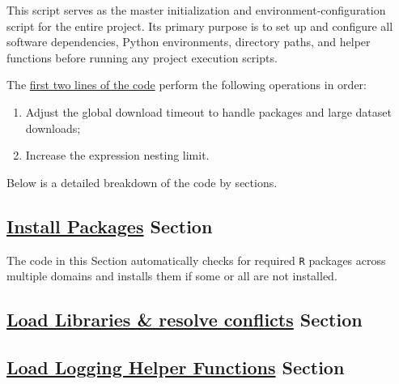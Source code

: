 \documentclass[
]{report}
\providecommand{\tightlist}{%
  \setlength{\itemsep}{0pt}\setlength{\parskip}{0pt}}
\begin{document}
\hfill\break

This script serves as the master initialization and environment-configuration script for the entire project.
Its primary purpose is to set up and configure all software dependencies, Python environments, directory paths, and helper functions before running any project execution scripts.

The \href{https://github.com/AzKurban-edX-DS/edx.capstone.choose-your-own/blob/main/r/support-scripts/setup.R\#L5-L6}{first two lines of the code} perform the following operations in order:

\begin{enumerate}
\def\labelenumi{\arabic{enumi}.}
\tightlist
\item
  Adjust the global download timeout to handle packages and large dataset downloads;
\item
  Increase the expression nesting limit.
\end{enumerate}

Below is a detailed breakdown of the code by sections.

\subsection{\texorpdfstring{\href{https://github.com/AzKurban-edX-DS/edx.capstone.choose-your-own/blob/main/r/support-scripts/setup.R\#L8-L85}{Install Packages} Section}{Install Packages Section}}\label{install-packages-section}

\hfill\break

The code in this Section automatically checks for required \texttt{R} packages across multiple domains and installs them if some or all are not installed.

\subsection{\texorpdfstring{\href{https://github.com/AzKurban-edX-DS/edx.capstone.choose-your-own/blob/main/r/support-scripts/setup.R\#L86-L167}{Load Libraries \& resolve conflicts} Section}{Load Libraries \& resolve conflicts Section}}\label{load-libraries-resolve-conflicts-section}

\hfill\break

\subsection{\texorpdfstring{\href{https://github.com/AzKurban-edX-DS/edx.capstone.choose-your-own/blob/main/r/support-scripts/setup.R\#L168-L177}{Load Logging Helper Functions} Section}{Load Logging Helper Functions Section}}\label{load-logging-helper-functions-section}
\end{document}
